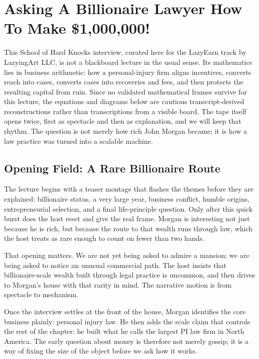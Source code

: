 \chapter{Asking A Billionaire Lawyer How To Make \$1{,}000{,}000!}

This School of Hard Knocks interview, curated here for the LazyEarn track by LazyingArt LLC, is not a blackboard lecture in the usual sense. Its mathematics lies in business arithmetic: how a personal-injury firm aligns incentives, converts reach into cases, converts cases into recoveries and fees, and then protects the resulting capital from ruin. Since no validated mathematical frames survive for this lecture, the equations and diagrams below are cautious transcript-derived reconstructions rather than transcriptions from a visible board. The tape itself opens twice, first as spectacle and then as explanation, and we will keep that rhythm. The question is not merely how rich John Morgan became; it is how a law practice was turned into a scalable machine.

\section{Opening Field: A Rare Billionaire Route}

The lecture begins with a teaser montage that flashes the themes before they are explained: billionaire status, a very large year, business conflict, humble origins, entrepreneurial selection, and a final life-principle question. Only after this quick burst does the host reset and give the real frame. Morgan is interesting not just because he is rich, but because the route to that wealth runs through law, which the host treats as rare enough to count on fewer than two hands.

That opening matters. We are not yet being asked to admire a mansion; we are being asked to notice an unusual commercial path. The host insists that billionaire-scale wealth built through legal practice is uncommon, and then drives to Morgan's house with that rarity in mind. The narrative motion is from spectacle to mechanism.

Once the interview settles at the front of the house, Morgan identifies the core business plainly: personal injury law. He then adds the scale claim that controls the rest of the chapter: he built what he calls the largest PI law firm in North America. The early question about money is therefore not merely gossip; it is a way of fixing the size of the object before we ask how it works.


